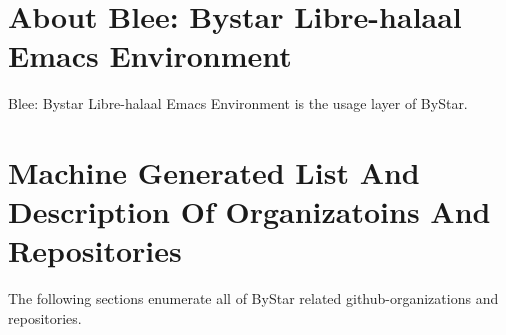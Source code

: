 \section{About Blee: Bystar Libre-halaal Emacs Environment}


Blee: Bystar Libre-halaal Emacs Environment is the usage layer of ByStar.


\begin{comment}
*  [[elisp:(org-cycle)][| ]]  [[elisp:(blee:ppmm:org-mode-toggle)][Nat]] [[elisp:(beginning-of-buffer)][Top]] [[elisp:(delete-other-windows)][(1)]] || /DBLOCK: Table Of Contents/  ::  [[elisp:(org-cycle)][| ]]
\end{comment}

\tableofcontents




\begin{comment}
*  [[elisp:(org-cycle)][| ]] [[elisp:(org-show-subtree)][|=]] [[elisp:(show-children 10)][|V]] [[elisp:(bx:orgm:indirectBufOther)][|>]] [[elisp:(bx:orgm:indirectBufMain)][|I]] [[elisp:(blee:ppmm:org-mode-toggle)][|N]] [[elisp:(org-top-overview)][|O]] [[elisp:(progn (org-shifttab) (org-content))][|C]] [[elisp:(delete-other-windows)][|1]]  /Section/   Machine Generated List And Description Of Organizatoins And Repositories ::  [[elisp:(org-cycle)][| ]]
\end{comment}

\section{Machine Generated List And Description Of Organizatoins And Repositories}

The following sections enumerate all of ByStar related
github-organizations and repositories.

\begin{comment}
*  [[elisp:(org-cycle)][| ]]  [[elisp:(blee:ppmm:org-mode-toggle)][Nat]] [[elisp:(beginning-of-buffer)][Top]] [[elisp:(delete-other-windows)][(1)]] || /Input/  [[elisp:(blee:file-goto-contents "./githubReport.tex")][Goto ./githubReport.tex]] ::  [[elisp:(org-cycle)][| ]]
\end{comment}

